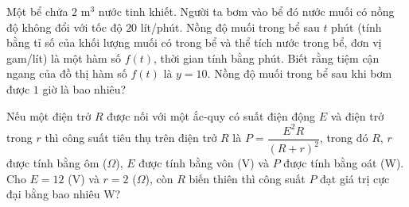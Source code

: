 \begin{bt}%
	Một bể chứa $2$ m$^3$ nước tinh khiết. Người ta bơm vào bể đó nước muối có nồng độ không đổi với tốc độ $20$ lít/phút. Nồng độ muối trong bể sau $t$ phút (tính bằng tỉ số của khối lượng muối có trong bể và thể tích nước trong bể, đơn vị gam/lít) là một hàm số $f(t)$, thời gian tính bằng phút. Biết rằng tiệm cận ngang của đồ thị hàm số $f(t)$ là $y=10$.  Nồng độ muối trong bể sau khi bơm được $1$ giờ là bao nhiêu?
\end{bt}

\begin{bt}%
	Nếu một điện trở $R$ được nối với một ắc-quy có suất điện động $E$ và điện trở trong $r$ thì công suất tiêu thụ trên điện trở $R$ là $P=\dfrac{E^2R}{(R+r)^2}$, trong đó $R$, $r$ được tính bằng ôm ($\Omega$), $E$ được  tính bằng vôn (V) và $P$ được tính bằng oát (W). Cho $E=12$ (V) và $r=2$ ($\Omega$), còn $R$ biến thiên thì công suất $P$ đạt giá trị cực đại bằng bao nhiêu W?
\end{bt}

